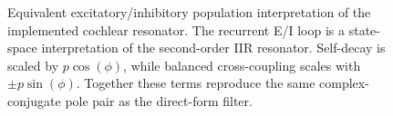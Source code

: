 \begin{figure}[htbp]
    \caption{Equivalent excitatory/inhibitory population interpretation of the implemented cochlear resonator. The recurrent E/I loop is a state-space interpretation of the second-order IIR resonator. Self-decay is scaled by $p\cos(\phi)$, while balanced cross-coupling scales with $\pm p\sin(\phi)$. Together these terms reproduce the same complex-conjugate pole pair as the direct-form filter.}
    \label{fig:ei_population_resonator}
\end{figure}
